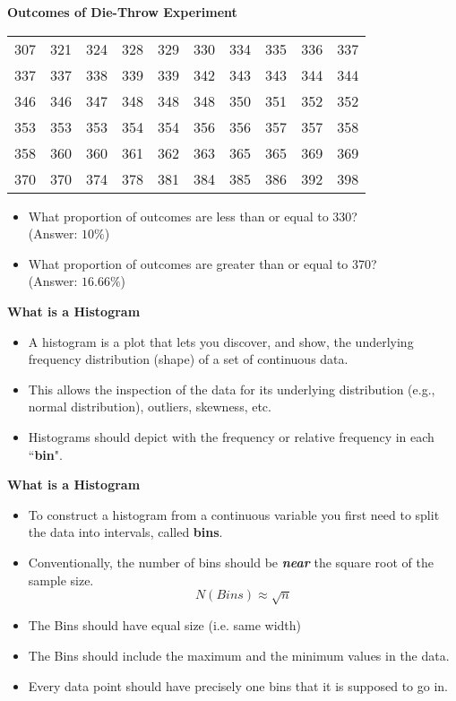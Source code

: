\documentclass[]{report}
\begin{document}
{
\textbf{Outcomes of Die-Throw Experiment}
\small
\begin{center}
\begin{tabular}{|c c c c c c c c c c|}
\hline
307 & 321 & 324 & 328 & 329 & 330 & 334 & 335 & 336 &337 \\
337 & 337 & 338 & 339 & 339 & 342 & 343 & 343 & 344 &344 \\
346 & 346 & 347 & 348 & 348 & 348 & 350 & 351 & 352 &352 \\
353 & 353 & 353 & 354 & 354 & 356 & 356 & 357 & 357 &358 \\
358 & 360 & 360 & 361 & 362 & 363 & 365 & 365 & 369 &369 \\
370 & 370 & 374 & 378 & 381 & 384 & 385 & 386 & 392 &398 \\
\hline
\end{tabular}
\end{center}
\normalsize
{}
\begin{itemize}
\item What proportion of outcomes are less than or equal to 330? \\ (Answer: $10\%$)
\item What proportion of outcomes are greater than or equal to 370?\\ (Answer: $16.66\%$)
\end{itemize}
}
{
\textbf{What is a Histogram}

\begin{itemize}
\item A histogram is a plot that lets you discover, and show, the underlying frequency distribution (shape) of a set of continuous data.
\item This allows the inspection of the data for its underlying distribution (e.g., normal distribution), outliers, skewness, etc. 
\item Histograms should depict with the frequency or relative frequency in each ``\textbf{bin}".

\end{itemize}
}
{
\textbf{What is a Histogram}

\begin{itemize}
\item To construct a histogram from a continuous variable you first need to split the data into intervals, called \textbf{bins}.
\item Conventionally, the number of bins should be \textbf{\textit{near}} the square root of the sample size.
\[ N(Bins) \approx \sqrt{n} \]

\item The Bins should have equal size (i.e. same width)
\item The Bins should include the maximum and the minimum values in the data.
\item Every data point should have precisely one bins that it is supposed to go in.

\end{itemize}
}
\end{document}
